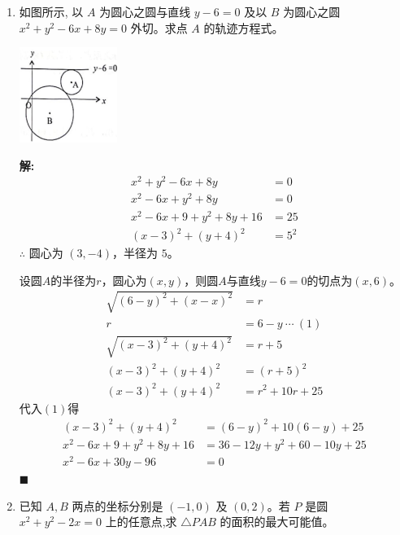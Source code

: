 \documentclass[10pt]{article}
\newcommand{\sol}{\textbf{解:} }
\begin{document}
\begin{enumerate}[leftmargin=*]
        \newpage
  \item 如图所示, 以 $A$ 为圆心之圆与直线 $y-6=0$ 及以 $B$ 为圆心之圆 $x^{2}+y^{2}-6 x+8 y=0$ 外切。求点 $A$ 的轨迹方程式。
        \begin{center}
          \includegraphics[max width=0.25\textwidth]{2024_06_07_f484519cd4dc635602b3g-04}
        \end{center}

        \sol{}
        \begin{align*}
          x^{2} + y^{2} - 6x + 8y          & = 0     \\
          x^{2} - 6x + y^{2} + 8y          & = 0     \\
          x^{2} - 6x + 9 + y^{2} + 8y + 16 & = 25    \\
          (x-3)^{2} + (y+4)^{2}            & = 5^{2}
        \end{align*}
        $\therefore$ 圆心为 $(3, -4)$，半径为 $5$。

        设圆$A$的半径为$r$，圆心为$(x, y)$，则圆$A$与直线$y-6=0$的切点为$(x, 6)$。
        \begin{align*}
          \sqrt{(6-y)^{2} + (x-x)^{2}} & = r                  \\
          r                            & = 6 - y\ \cdots\ (1)
          \\
          \sqrt{(x-3)^{2} + (y+4)^{2}} & = r + 5              \\
          (x-3)^{2} + (y+4)^{2}        & = (r+5)^{2}          \\
          (x-3)^{2} + (y+4)^{2}        & = r^{2} + 10r + 25
        \end{align*}
        代入$(1)$得
        \begin{align*}
          (x-3)^{2} + (y+4)^{2}        & = (6-y)^{2} + 10(6-y) + 25       \\
          x^2 - 6x + 9 + y^2 + 8y + 16 & = 36 - 12y + y^2 + 60 - 10y + 25 \\
          x^2 - 6x + 30y - 96          & = 0
        \end{align*} \hfill$\blacksquare$

  \item 已知 $A, B$ 两点的坐标分别是 $(-1,0)$ 及 $(0,2)$。若 $P$ 是圆 $x^{2}+y^{2}-2 x=0$ 上的任意点,求 $\triangle P A B$ 的面积的最大可能值。


\end{enumerate}
\end{document}
